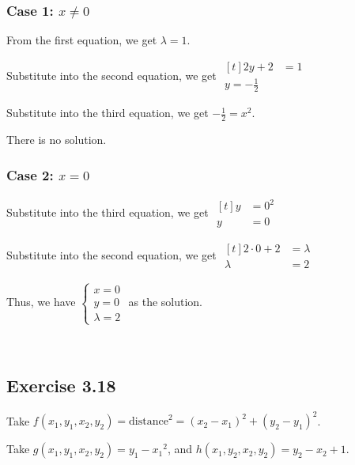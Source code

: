 \subsubsection*{Case 1: $x \neq 0$}

From the first equation, we get $\lambda = 1$. 

Substitute into the second equation, we get $\begin{aligned}[t]
    2y + 2 & = 1 \\ y = -\frac{1}{2}
\end{aligned}$

Substitute into the third equation, we get $-\frac{1}{2} = x^2$. 

There is no solution. 

\subsubsection*{Case 2: $x = 0$}

Substitute into the third equation, we get $\begin{aligned}[t]
    y & = 0^2 \\
    y & = 0
\end{aligned}$

Substitute into the second equation, we get $\begin{aligned}[t]
    2 \cdot 0 + 2 & = \lambda \\
    \lambda       & = 2
\end{aligned}$

Thus, we have $\begin{cases} x = 0 \\ y = 0 \\ \lambda = 2 \end{cases}$ as the solution. 

{~~~}

\subsection*{Exercise 3.18}

Take $f(x_1, y_1, x_2, y_2) = \text{distance}^2 = (x_2 - x_1)^2 + (y_2 - y_1)^2$. 

Take $g(x_1, y_1, x_2, y_2) = y_1 - {x_1}^2$, and $h(x_1, y_2, x_2, y_2) = y_2 - x_2 + 1$. 

